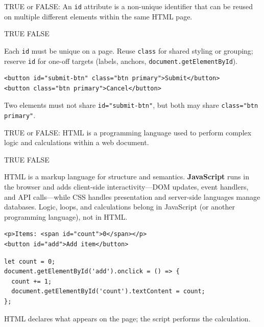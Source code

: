 \newpage



\question[4]
TRUE or FALSE: An \texttt{id} attribute is a non-unique identifier that can be reused on multiple different elements within the same HTML page.
\begin{choices}
  \choice TRUE
  \CorrectChoice FALSE
\end{choices}
\begin{solution}
  Each \texttt{id} must be unique on a page. Reuse \texttt{class} for shared styling or grouping; reserve \texttt{id} for one-off targets (labels, anchors, \lstinline[style=jsinline]|document.getElementById|).
\begin{lstlisting}[style=htmlinline]
<button id="submit-btn" class="btn primary">Submit</button>
<button class="btn primary">Cancel</button>
\end{lstlisting}
  Two elements must not share \texttt{id="submit-btn"}, but both may share \texttt{class="btn primary"}.
\end{solution}

\question[4]
TRUE or FALSE: HTML is a programming language used to perform complex logic and calculations within a web document.
\begin{choices}
  \choice TRUE
  \CorrectChoice FALSE
\end{choices}
\begin{solution}
  HTML is a markup language for structure and semantics. \textbf{JavaScript} runs in the browser and adds client-side interactivity---DOM updates, event handlers, and API calls---while CSS handles presentation and server-side languages manage databases. Logic, loops, and calculations belong in JavaScript (or another programming language), not in HTML.
\begin{lstlisting}[style=htmlinline]
<p>Items: <span id="count">0</span></p>
<button id="add">Add item</button>
\end{lstlisting}
\begin{lstlisting}[style=js]
let count = 0;
document.getElementById('add').onclick = () => {
  count += 1;
  document.getElementById('count').textContent = count;
};
\end{lstlisting}
  HTML declares what appears on the page; the script performs the calculation.
\end{solution}


\newpage

